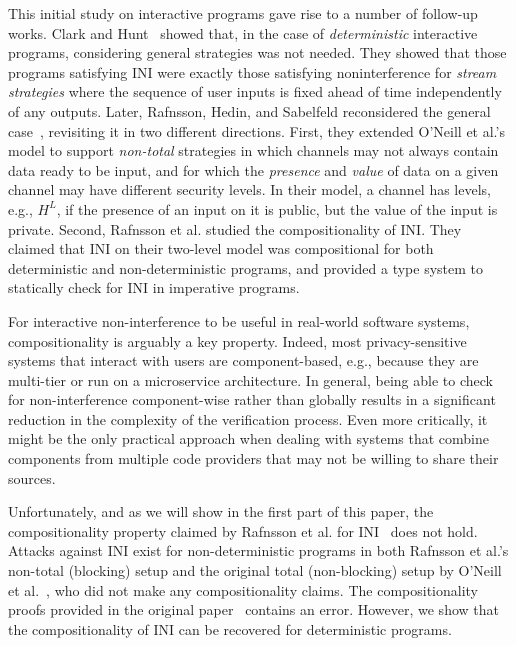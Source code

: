 \documentclass[preprint,5p,twocolumn]{elsarticle}
\begin{document}
This initial study on interactive programs gave rise to a number of follow-up works.
Clark and Hunt~\cite{Clark2008} showed that, in the case of \emph{deterministic} interactive
programs, considering general strategies was not needed. They showed that those programs satisfying INI
were exactly those satisfying noninterference for \emph{stream strategies} where the sequence of user
inputs is fixed ahead of time independently of any outputs. Later, Rafnsson, Hedin, and Sabelfeld
reconsidered the general case~\cite{Rafnsson2012}, revisiting it in two different directions. First, they
extended O'Neill et al.'s model to support \emph{non-total} strategies in which channels may not always
contain data ready to be input, and for which the \emph{presence} and \emph{value} of data on a given channel
may have different security levels. In their model, a channel has levels, e.g., $H^L$, if the
presence of an input on it is public, but the value of the input is private.
Second, Rafnsson et al. studied the compositionality of INI. They claimed that INI on their two-level model
was compositional for both deterministic and non-deterministic programs, and provided a type system to statically
check for INI in imperative programs.

For interactive non-interference to be useful in real-world software systems, compositionality is arguably
a key property. Indeed, most privacy-sensitive systems that interact with users
are component-based, e.g., because they are multi-tier or run on a microservice architecture.
In general, being able to check for non-interference component-wise rather than globally results
in a significant reduction in the complexity of the verification process.
Even more critically, it might be the only practical approach when dealing with systems that
combine components from multiple code providers that may not be willing to share their sources.

Unfortunately, and as we will show in the first part of this paper, the compositionality property claimed
by Rafnsson et al. for INI~\cite[Theorem V.1]{Rafnsson2012} does not hold. Attacks against
INI exist for non-deterministic programs in both Rafnsson et al.'s non-total (blocking) setup and the original
total (non-blocking) setup by O'Neill et al.~\cite{ONeill2006}, who did not make any compositionality claims.
The compositionality proofs provided in the original paper~\cite{Rafnsson2012} contains an error. However, we show that the compositionality of INI
can be recovered for deterministic programs.
\end{document}
